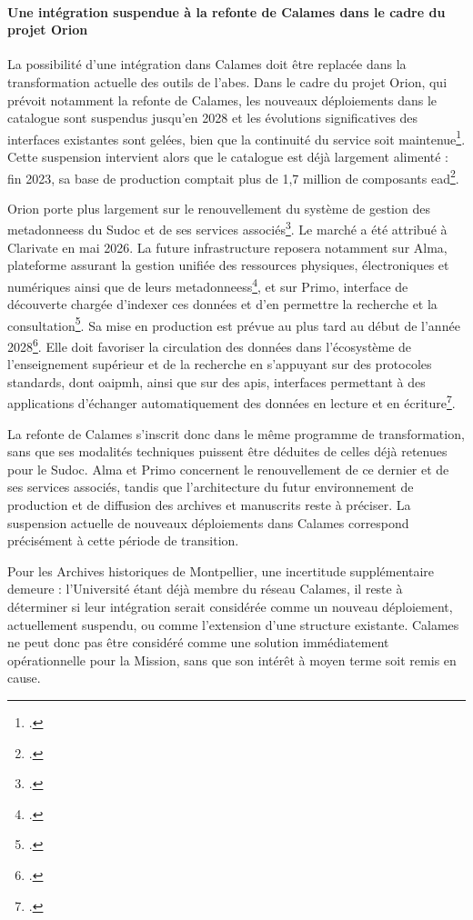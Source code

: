 \paragraph{Une intégration suspendue à la refonte de Calames dans le cadre du projet Orion}

La possibilité d'une intégration dans Calames doit être replacée dans la transformation actuelle des outils de l'\Gls{abes}. Dans le cadre du projet Orion, qui prévoit notamment la refonte de Calames, les nouveaux déploiements dans le catalogue sont suspendus jusqu'en 2028 et les évolutions significatives des interfaces existantes sont gelées, bien que la continuité du service soit maintenue\footcite{FilAbesOrion2026}. Cette suspension intervient alors que le catalogue est déjà largement alimenté : fin 2023, sa base de production comptait plus de 1,7 million de composants \gls{ead}\footcite{ABESStatistiquesCalames2023}.

Orion porte plus largement sur le renouvellement du système de gestion des \glspl{metadonnees} du Sudoc et de ses services associés\footcite{AbesOrion2026}. Le marché a été attribué à Clarivate en mai 2026. La future infrastructure reposera notamment sur Alma, plateforme assurant la gestion unifiée des ressources physiques, électroniques et numériques ainsi que de leurs \glspl{metadonnees}\footcite{ExLibrisAlmaDocumentation}, et sur Primo, interface de découverte chargée d'indexer ces données et d'en permettre la recherche et la consultation\footcite{ExLibrisPrimoDocumentation}. Sa mise en production est prévue au plus tard au début de l'année 2028\footcite{FilAbesOrionClarivate2026}. Elle doit favoriser la circulation des données dans l'écosystème de l'enseignement supérieur et de la recherche en s'appuyant sur des protocoles standards, dont \gls{oaipmh}, ainsi que sur des \glspl{api}, interfaces permettant à des applications d'échanger automatiquement des données en lecture et en écriture\footcite{FilAbesOrionClarivate2026}.

La refonte de Calames s'inscrit donc dans le même programme de transformation, sans que ses modalités techniques puissent être déduites de celles déjà retenues pour le Sudoc. Alma et Primo concernent le renouvellement de ce dernier et de ses services associés, tandis que l'architecture du futur environnement de production et de diffusion des archives et manuscrits reste à préciser. La suspension actuelle de nouveaux déploiements dans Calames correspond précisément à cette période de transition.

Pour les Archives historiques de Montpellier, une incertitude supplémentaire demeure : l'Université étant déjà membre du réseau Calames, il reste à déterminer si leur intégration serait considérée comme un nouveau déploiement, actuellement suspendu, ou comme l'extension d'une structure existante. Calames ne peut donc pas être considéré comme une solution immédiatement opérationnelle pour la Mission, sans que son intérêt à moyen terme soit remis en cause.


